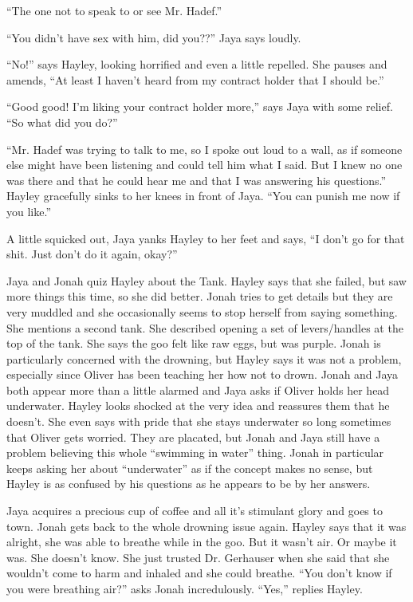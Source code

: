 ``The one not to speak to or see Mr. Hadef.''

``You didn't have sex with him, did you??'' Jaya says loudly.

``No!'' says Hayley, looking horrified and even a little repelled.  She pauses and amends, ``At least I haven't heard from my contract holder that I should be.''

``Good good!  I'm liking your contract holder more,'' says Jaya with some relief.  ``So what did you do?''

``Mr. Hadef was trying to talk to me, so I spoke out loud to a wall, as if someone else might have been listening and could tell him what I said. But I knew no one was there and that he could hear me and that I was answering his questions.''  Hayley gracefully sinks to her knees in front of Jaya.  ``You can punish me now if you like.''  

A little squicked out, Jaya yanks Hayley to her feet and says, ``I don't go for that shit.  Just don't do it again, okay?''



Jaya and Jonah quiz Hayley about the Tank.  Hayley says that she failed, but saw more things this time, so she did better.   Jonah tries to get details but they are very muddled and she occasionally seems to stop herself from saying something.  She mentions a second tank.  She described opening a set of levers/handles at the top of the tank.  She says the goo felt like raw eggs, but was purple.  Jonah is particularly concerned with the drowning, but Hayley says it was not a problem, especially since Oliver has been teaching her how not to drown.  Jonah and Jaya both appear more than a little alarmed and Jaya asks if Oliver holds her head underwater.  Hayley looks shocked at the very idea and reassures them that he doesn't.  She even says with pride that she stays underwater so long sometimes that Oliver gets worried.  They are placated, but Jonah and Jaya still have a problem believing this whole ``swimming in water'' thing.  Jonah in particular keeps asking her about ``underwater'' as if the concept makes no sense, but Hayley is as confused by his questions as he appears to be by her answers.



Jaya acquires a precious cup of coffee and all it's stimulant glory and goes to town.  Jonah gets back to the whole drowning issue again.  Hayley says that it was alright, she was able to breathe while in the goo.  But it wasn't air.  Or maybe it was.  She doesn't know.  She just trusted Dr. Gerhauser when she said that she wouldn't come to harm and inhaled and she could breathe.  ``You don't know if you were breathing air?'' asks Jonah incredulously. ``Yes,'' replies Hayley.

